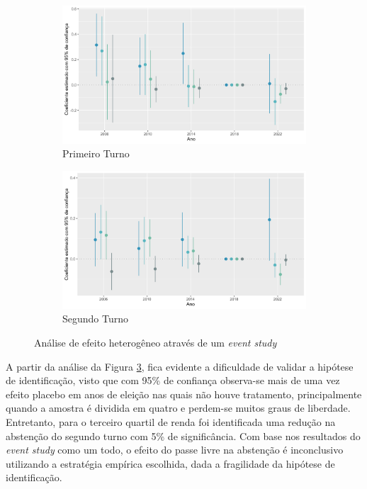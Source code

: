 \begin{figure}[!ht]
    \begin{subfigure}[t]{0.49\linewidth}
      \includegraphics[width = \linewidth]{relatorios/passe-livre/graficos/event_study_heter_1t.png}
      \caption{Primeiro Turno}
      \label{fig_eventStud1}
    \end{subfigure}
    \hfill
    \begin{subfigure}[t]{0.49\linewidth}
      \includegraphics[width = \linewidth]{relatorios/passe-livre/graficos/event_study_heter_2t.png}
      \caption{Segundo Turno}
      \label{fig_eventStud2}
    \end{subfigure}
    \caption{Análise de efeito heterogêneo através de um \textit{event study}}

    \label{fig_eventStud}
  \end{figure}

A partir da análise da Figura \ref{fig_eventStud}, fica evidente a dificuldade de validar a hipótese de identificação, visto que com 95\% de confiança observa-se mais de uma vez efeito placebo em anos de eleição nas quais não houve tratamento, principalmente quando a amostra é dividida em quatro e perdem-se muitos graus de liberdade. Entretanto, para o terceiro quartil de renda foi identificada uma redução na abstenção do segundo turno com 5\% de significância. Com base nos resultados do \textit{event study} como um todo, o efeito do passe livre na abstenção é inconclusivo utilizando a estratégia empírica escolhida, dada a fragilidade da hipótese de identificação.

